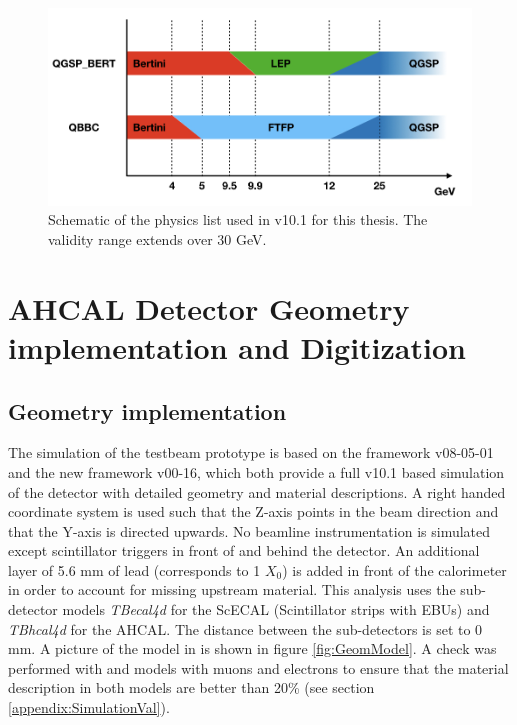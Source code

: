 \begin{figure}[htbp!]
  \centering
  \includegraphics[width=1\linewidth]{chap4/fig/PhysicsLists.jpeg}
  \caption{Schematic of the physics list used in \geant v10.1 for this thesis. The validity range extends over 30 GeV.} \label{fig:physics_list}
\end{figure}

\section{AHCAL Detector Geometry implementation and Digitization}

\subsection{Geometry implementation}

The simulation of the testbeam prototype is based on the \mokka framework v08-05-01 and the new \ddhep framework v00-16, which both provide a full \geant v10.1 based simulation of the detector with detailed geometry and material descriptions. A right handed coordinate system is used such that the Z-axis points in the beam direction and that the Y-axis is directed upwards. No beamline instrumentation is simulated except scintillator triggers in front of and behind the detector. An additional layer of 5.6 mm of lead (corresponds to 1 $X_0$) is added in front of the calorimeter in order to account for missing upstream material. This analysis uses the sub-detector \mokka models \textit{TBecal4d} for the ScECAL (Scintillator strips with EBUs) and \textit{TBhcal4d} for the AHCAL. The distance between the sub-detectors is set to 0 mm. A picture of the model in \ddhep is shown in figure \ref{fig:GeomModel}. A check was performed with \mokka and \ddhep models with muons and electrons to ensure that the material description in both models are better than 20\% (see section \ref{appendix:SimulationVal}).\\

